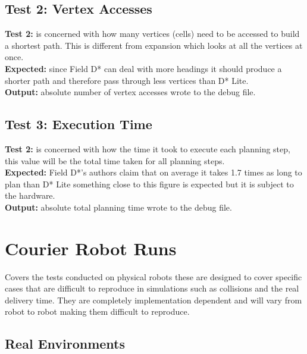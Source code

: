 \subsection{Test 2: Vertex Accesses}

\noindent
\textbf{Test 2:} is concerned with how many vertices (cells) need to be accessed to build a shortest path. This is different from expansion which looks at all the vertices at once.\\

\noindent
\textbf{Expected:} since Field D* can deal with more headings it should produce a shorter path and therefore pass through less vertices than D* Lite.\\

\noindent
\textbf{Output:} absolute number of vertex accesses wrote to the debug file.

\subsection{Test 3: Execution Time}

\noindent
\textbf{Test 2:} is concerned with how the time it took to execute each planning step, this value will be the total time taken for all planning steps.\\

\noindent
\textbf{Expected:} Field D*'s authors claim that on average it takes 1.7 times as long to plan than D* Lite something close to this figure is expected but it is subject to the hardware.\\

\noindent
\textbf{Output:} absolute total planning time wrote to the debug file.


\section{Courier Robot Runs}

Covers the tests conducted on physical robots these are designed to cover specific cases that are difficult to reproduce in simulations such as collisions and the real delivery time. They are completely implementation dependent and will vary from robot to robot making them difficult to reproduce.

\subsection{Real Environments}

